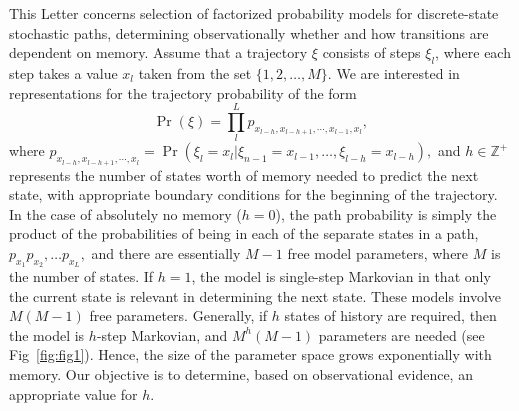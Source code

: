\documentclass[prl,twocolumn,groupedaddress]{revtex4-1}
\renewcommand{\bf}[1]{\textbf{#1}}
\begin{document}
This Letter concerns selection of factorized probability models for discrete-state stochastic paths, determining observationally whether and how transitions  are  dependent on memory. Assume that a trajectory $\xi$ consists of steps $\xi_l$, where each step takes  a value $x_l$ taken from the set $\{1,2,\ldots,M\}.$ We are interested in representations for the trajectory probability of the  form
%
\begin{equation}
\Pr(\xi) = \prod_{l}^L p_{x_{l-h},x_{l-h+1},\cdots,x_{l-1},x_l}, 
\label{eq:factorize}
\end{equation}
%
where $p_{x_{l-h},x_{l-h+1},\cdots,x_l} =  \Pr(\xi_l = x_l | \xi_{n-1} = x_{l-1}, \ldots, \xi_{l-h} = x_{l-h} ),$ and $h\in\mathbb{Z}^+$ represents the number of states worth of memory needed to predict the next state, with appropriate boundary conditions for the beginning of the trajectory. In the case of absolutely no memory ($h=0$), the path probability is simply the product of the probabilities of being in each of the separate states in a path, $p_{x_1}p_{x_2},\ldots p_{x_L},$ and there are essentially $M-1$ free model parameters, where $M$ is the number of states. If $h=1$, the model is single-step Markovian in that only the current state is relevant in determining the next state. These models involve $M(M-1)$ free parameters. Generally, if $h$ states of history are required, then the model is $h$-step Markovian, and $M^h(M-1)$ parameters are needed (see Fig~\ref{fig:fig1}). Hence, the size of the parameter space grows exponentially with memory. Our objective is to determine, based on observational evidence, an appropriate value for $h$. 

 
 
\end{document}
